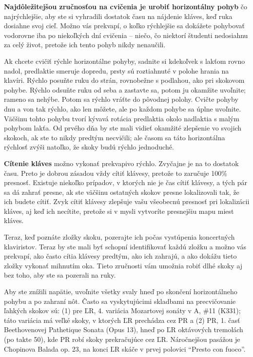 \documentclass[11pt,a4paper]{book}
\begin{document}
\textbf{Najdôležitejšou zručnosťou na cvičenia je urobiť horizontálny pohyb} čo najrýchlejšie, aby ste si vyhradili dostatok času na nájdenie kláves, keď ruka dosiahne svoj cieľ. Možno vás prekvapí, o koľko rýchlejšie sa dokážete pohybovať vodorovne iba po niekoľkých dní cvičenia – niečo, čo niektorí študenti nedosiahnu za celý život, pretože ich tento pohyb nikdy nenaučili.

Ak chcete cvičiť rýchle horizontálne pohyby, sadnite si kdekoľvek s lakťom rovno nadol, predlaktie smeruje dopredu, prsty sú roztiahnuté v polohe hrania na klavíri. Rýchlo posuňte ruku do strán, rovnobežne s podlahou, ako pri skokovom pohybe. Rýchlo odsuňte ruku od seba a zastavte sa, potom ju okamžite uvoľnite; rameno sa nehýbe. Potom sa rýchlo vráťte do pôvodnej polohy. Cvičte pohyby dnu a von tak rýchlo, ako len môžete, ale po každom pohybe sa úplne uvoľnite. Väčšinu tohto pohybu tvorí kývavá rotácia predlaktia okolo nadlaktia s malým pohybom lakťa. Od prvého dňa by ste mali vidieť okamžité zlepšenie vo svojich skokoch, ak ste to nikdy predtým necvičili; ale časom sa táto horizontálna rýchlosť zvýši natoľko, že skoky budú rýchlo jednoduché.

\textbf{Cítenie kláves} možno vykonať prekvapivo rýchlo. Zvyčajne je na to dostatok času. Preto je dobrou zásadou vždy cítiť klávesy, pretože to zaručuje 100\% presnosť. Existuje niekoľko prípadov, v ktorých nie je čas cítiť klávesy, a tých pár sa dá zahrať presne, ak ste väčšinu ostatných skokov presne lokalizovali tak, že ich budete cítiť. Zvyk cítiť klávesy zlepšuje vašu všeobecnú presnosť pri lokalizácii kláves, aj keď ich necítite, pretože si v mysli vytvoríte presnejšiu mapu miest kláves.

Teraz, keď poznáte zložky skoku, pozerajte ich počas vystúpenia koncertných klaviristov. Teraz by ste mali byť schopní identifikovať každú zložku a možno vás prekvapí, ako často cítia klávesy predtým, ako ich zahrajú, a ako dokážu tieto zložky vykonať mihnutím oka. Tieto zručnosti vám umožnia robiť dlhé skoky aj bez toho, aby ste sa pozerali na ruky.

Aby ste znížili napätie, uvoľnite všetky svaly hneď po skončení horizontálneho pohybu a po zahraní nôt. Často sa vyskytujúcimi skladbami na precvičovanie ľahkých skokov sú: (1) pre ĽR, 4. variácia Mozartovej sonáty v A, \#11 (K331); táto variácia má veľké skoky, v ktorých ĽR prechádza cez PR a (2) PR, 1. časť Beethovenovej Pathetique Sonata (Opus 13), hneď po ĽR oktávových tremolách (po takte 50), kde PR robí skoky prekračujúce cez ĽR. Náročnejšou pasážou je Chopinova Balada op. 23, na konci ĽR skáče v prvej polovici “Presto con fuoco”.
\end{document}
